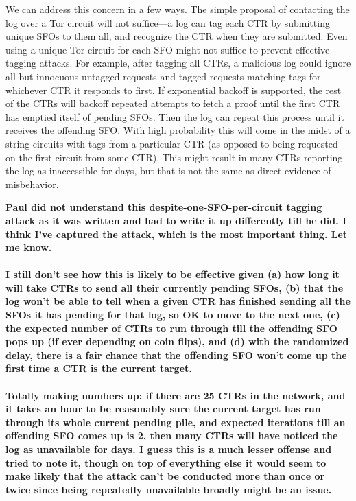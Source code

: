 We can address this concern in a few ways. The simple proposal of contacting the
log over a Tor circuit will not suffice---a log can tag each CTR by submitting
unique SFOs to them all, and recognize the CTR when they are submitted. Even
using a unique Tor circuit for each SFO might not suffice to prevent effective
tagging attacks. For example, after tagging all CTRs, a malicious log could
ignore all but innocuous untagged requests and tagged requests matching tags for
whichever CTR it responds to first. If exponential backoff is supported, the
rest of the CTRs will backoff repeated attempts to fetch a proof until the first
CTR has emptied itself of pending SFOs. Then the log can repeat this process
until it receives the offending SFO\@. With high probability this will come in
the midst of a string circuits with tags from a particular CTR (as opposed to
being requested on the first circuit from some CTR). This might result in many
CTRs reporting the log as inaccessible for days, but that is not the same as
direct evidence of misbehavior.

{\bf \color{red} Paul did not understand this
  despite-one-SFO-per-circuit tagging attack as it was written and had
  to write it up differently till he did. I think I've captured the
  attack, which is the most important thing. Let me know.\\ \\
  I still don't see how this is likely to be effective given (a) how long it
  will take CTRs to send all their currently pending SFOs, (b) that the log
  won't be able to tell when a given CTR has finished sending all the SFOs it
  has pending for that log, so OK to move to the next one, (c) the expected
  number of CTRs to run through till the offending SFO pops up (if ever
  depending on coin flips), and (d) with the randomized delay, there is a fair
  chance that the offending SFO won't come up the first time a CTR is the
  current target.\\ \\
  Totally making numbers up: if there are 25 CTRs in the network, and
  it takes an hour to be reasonably sure the current target has run
  through its whole current pending pile, and expected iterations till
  an offending SFO comes up is 2, then many CTRs will have noticed
  the log as unavailable for days. I guess this is a much lesser
  offense and tried to note it, though on top of everything else
  it would seem to make likely that the attack can't be conducted
  more than once or twice since being repeatedly unavailable broadly
  might be an issue.}


